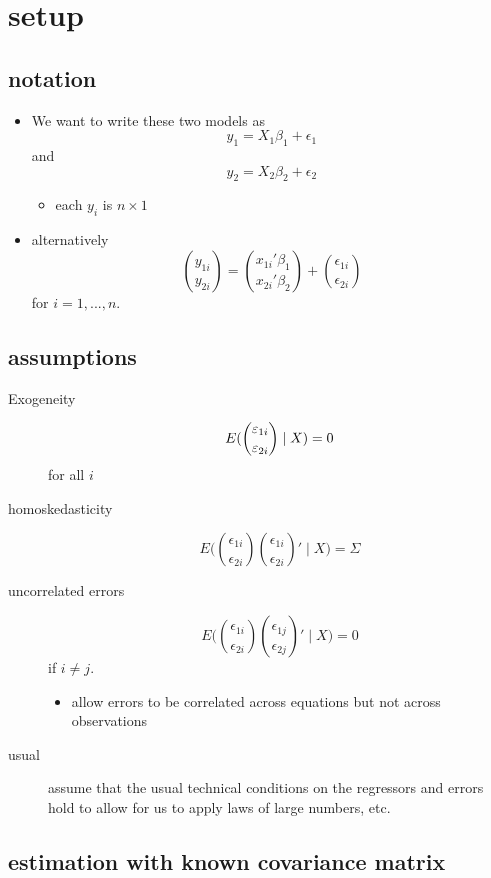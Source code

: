 \section{setup}
\subsection{notation}

\begin{itemize}
\item We want to write these two models as
       \[y_1 = X_1 \beta_1 + \epsilon_1\]
       and
       \[y_2 = X_2 \beta_2 + \epsilon_2\]
\begin{itemize}
\item each $y_i$ is $n \times 1$
\end{itemize}
\item alternatively
  \[ \binom{y_{1i}}{y_{2i}} = \binom{x_{1i}'\beta_1}{x_{2i}'\beta_2} + 
  \binom{\epsilon_{1i}}{ \epsilon_{2i}}\]
       for $i = 1,...,n$.
\end{itemize}

\subsection{assumptions}

\begin{description}
\item[Exogeneity] \[E(\binom{\varepsilon_{1i}}{\varepsilon_{2i}} \mid X) = 0\] for all $i$
\item[homoskedasticity] \[E\Big(\binom{\epsilon_{1i}}{\epsilon_{2i}} \binom{\epsilon_{1i}}{\epsilon_{2i}}' \mid X \Big) = \Sigma\]
\item[uncorrelated errors] \[E\Big(\binom{\epsilon_{1i}}{\epsilon_{2i}}
  \binom{\epsilon_{1j}}{\epsilon_{2j}}' \mid X \Big) = 0\] if $i \neq j$.
\begin{itemize}
\item allow errors to be correlated across equations but not across
         observations
\end{itemize}
\item[usual] assume that the usual technical conditions on the
                regressors and errors hold to allow for us to apply
                laws of large numbers, etc.
\end{description}

\subsection{estimation with known covariance matrix}

